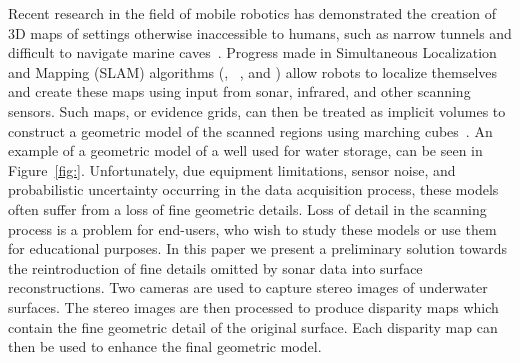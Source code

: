 \documentclass[a4paper,twoside]{article}
\begin{document}

\noindent Recent research in the field of mobile robotics has demonstrated the creation of 3D maps of settings otherwise inaccessible to humans, such as narrow tunnels and difficult to navigate marine caves~\cite{ICEX11,McVicker,McVicker2}. Progress made in Simultaneous Localization and Mapping (SLAM) algorithms  (\cite{Williams2000}, ~\cite{harbor}, and \cite{Fairfield2005,Fairfield2006}) allow robots to localize themselves and create these maps using input from sonar, infrared, and other scanning sensors. Such maps, or evidence grids, can then be treated as implicit volumes to construct a geometric model of the scanned regions using marching cubes~\cite{Lorensen}. An example of a geometric model of a well used for water storage, can be seen in Figure~\ref{fig:}.
Unfortunately, due equipment limitations, sensor noise, and probabilistic uncertainty occurring in the  data acquisition process, these models often suffer from a loss of fine geometric details. Loss of detail in the scanning process is a problem for end-users, who wish to study these models or use them for educational purposes.
In this paper we present a preliminary solution towards the reintroduction of fine details omitted by sonar data into surface reconstructions.  
Two cameras are used to capture stereo images of underwater surfaces.
The stereo images are then processed to produce disparity maps which contain the fine geometric detail of the original surface.
Each disparity map can then be used to enhance the final geometric model.
\end{document}
